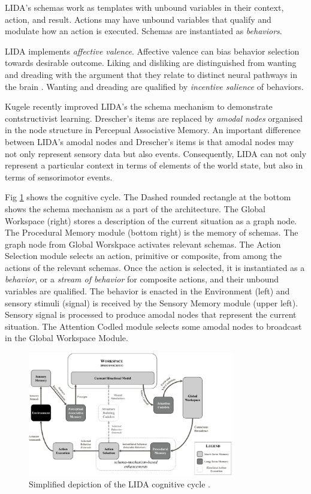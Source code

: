 \documentclass[runningheads]{llncs}
\begin{document}
LIDA's schemas work as templates with unbound variables in their context, action, and result. 
Actions may have  unbound variables that qualify and modulate how an action is executed. 
Schemas are instantiated as \textit{behaviors}. 

LIDA implements \textit{affective valence}. 
Affective valence can bias behavior selection towards desirable outcome. 
Liking and disliking are distinguished from wanting and dreading with the argument that they relate to distinct neural pathways in the brain \cite{kringelbach_functional_2010}. 
Wanting and dreading are qualified by \textit{incentive salience} of behaviors.   

Kugele \cite{kugele2025_constructivist} recently improved LIDA's the schema mechanism to demonstrate contstructivist learning.
Drescher's items are replaced by \textit{amodal nodes} organised in the node structure in Percepual Associative Memory. 
An important difference between LIDA's amodal nodes and Drescher's items is that amodal nodes may not only represent sensory data but also events. 
Consequently, LIDA can not only represent a particular context in terms of elements of the world state, but also in terms of sensorimotor events. 

Fig \ref{fig:lida} shows the cognitive cycle. 
The Dashed rounded rectangle at the bottom shows the schema mechanism as a part of the architecture. 
The Global Workspace (right) stores a description of the current situation as a graph node. 
The Procedural Memory module (bottom right) is the memory of schemas. 
The graph node from Global Worskpace activates relevant schemas. 
The Action Selection module selects an action, primitive or composite, from among the actions of the relevant schemas. 
Once the action is selected, it is instantiated as a \textit{behavior}, or a \textit{stream of behavior} for composite actions, and their unbound variables are qualified. 
The behavior is enacted in the Environment (left) and sensory stimuli (signal) is received by the Sensory Memory module (upper left).
Sensory signal is processed to produce amodal nodes that represent the current situation. 
The Attention Codled module selects some amodal nodes to broadcast in the Global Workspace Module. 

\begin{figure}
	\centering
	\includegraphics[width=0.8\textwidth]{Figure_LIDA.png}
	\caption{Simplified depiction of the LIDA cognitive cycle \cite[Fig. 4]{kugele2025_constructivist}.
	} 
	\label{fig:lida}
\end{figure}
\end{document}
